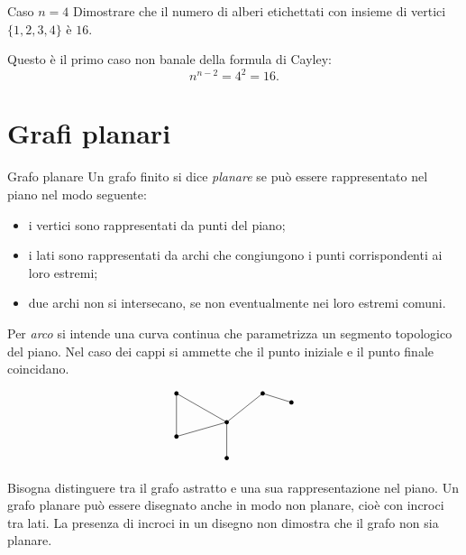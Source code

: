 \documentclass[a4paper]{article}
\begin{document}
\begin{snippetexercise}{Caso \(n=4\)}
    Dimostrare che il numero di alberi etichettati con insieme di vertici \(\{1,2,3,4\}\) è \(16\).

    Questo è il primo caso non banale della formula di Cayley:
    \[
        n^{n-2}=4^2=16.
    \]
\end{snippetexercise}

\section{Grafi planari}

\begin{snippetdefinition}{Grafo planare}
    Un grafo finito si dice \emph{planare} se può essere rappresentato nel piano nel modo seguente:
    \begin{itemize}
        \item i vertici sono rappresentati da punti del piano;
        \item i lati sono rappresentati da archi che congiungono i punti corrispondenti ai loro estremi;
        \item due archi non si intersecano, se non eventualmente nei loro estremi comuni.
    \end{itemize}
\end{snippetdefinition}

Per \emph{arco} si intende una curva continua che parametrizza un segmento topologico del piano. Nel caso dei cappi si ammette che il punto iniziale e il punto finale coincidano.

\[
    \begin{tikzpicture}[scale=1]
        \coordinate (a) at (0,0);
        \coordinate (b) at (0,1.2);
        \coordinate (c) at (1.4,0.4);
        \coordinate (d) at (1.4,-0.6);
        \coordinate (e) at (2.4,1.2);
        \coordinate (f) at (3.2,0.95);

        \draw (a)--(b);
        \draw (b)--(c);
        \draw (a)--(c);
        \draw (c)--(d);
        \draw (c)--(e);
        \draw (e)--(f);

        \foreach \p in {a,b,c,d,e,f}{
            \fill (\p) circle (1.7pt);
        }
    \end{tikzpicture}
\]

Bisogna distinguere tra il grafo astratto e una sua rappresentazione nel piano. Un grafo planare può essere disegnato anche in modo non planare, cioè con incroci tra lati. La presenza di incroci in un disegno non dimostra che il grafo non sia planare.
\end{document}
